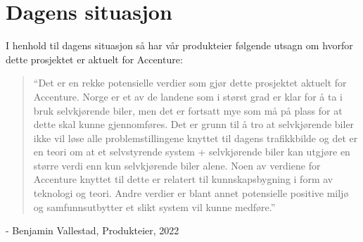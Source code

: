 \chapter{Dagens situasjon}
I henhold til dagens situasjon så har vår produkteier følgende utsagn om hvorfor dette prosjektet er aktuelt for Accenture:
\begin{quotation}
    ``Det er en rekke potensielle verdier som gjør dette prosjektet aktuelt for Accenture. Norge er et av de landene som i størst grad er klar for å ta i bruk selvkjørende biler, men det er fortsatt mye som må på plass for at dette skal kunne gjennomføres. Det er grunn til å tro at selvkjørende biler ikke vil løse alle problemstillingene knyttet til dagens trafikkbilde og det er en teori om at et selvstyrende system + selvkjørende biler kan utgjøre en større verdi enn kun selvkjørende biler alene. Noen av verdiene for Accenture knyttet til dette er relatert til kunnskapsbygning i form av teknologi og teori. Andre verdier er blant annet potensielle positive miljø og samfunnsutbytter et slikt system vil kunne medføre.''
\end{quotation}
\begin{flushright}
    - Benjamin Vallestad, Produkteier, 2022
\end{flushright}